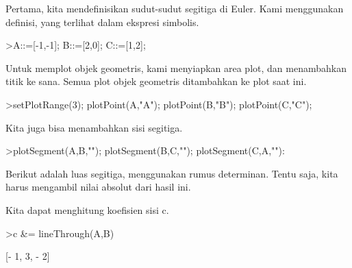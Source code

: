\documentclass[a4paper,10pt]{article}
\begin{document}
\begin{eulernotebook}
\begin{eulercomment}
\begin{eulercomment}
\begin{eulercomment}
\begin{eulercomment}
\begin{eulercomment}
\begin{eulercomment}
\begin{eulercomment}
\begin{eulercomment}
\begin{eulercomment}
\begin{eulercomment}
\begin{eulercomment}
\begin{eulercomment}
\begin{eulercomment}
\begin{eulercomment}
\begin{eulercomment}
\begin{eulercomment}
\begin{eulercomment}
Pertama, kita mendefinisikan sudut-sudut segitiga di Euler. Kami
menggunakan definisi, yang terlihat dalam ekspresi simbolis.
\end{eulercomment}
\begin{eulerprompt}
>A::=[-1,-1]; B::=[2,0]; C::=[1,2];
\end{eulerprompt}
\begin{eulercomment}
Untuk memplot objek geometris, kami menyiapkan area plot, dan
menambahkan titik ke sana. Semua plot objek geometris ditambahkan ke
plot saat ini.
\end{eulercomment}
\begin{eulerprompt}
>setPlotRange(3); plotPoint(A,"A"); plotPoint(B,"B"); plotPoint(C,"C");
\end{eulerprompt}
\begin{eulercomment}
Kita juga bisa menambahkan sisi segitiga.
\end{eulercomment}
\begin{eulerprompt}
>plotSegment(A,B,""); plotSegment(B,C,""); plotSegment(C,A,""):
\end{eulerprompt}
\begin{eulercomment}
Berikut adalah luas segitiga, menggunakan rumus determinan. Tentu
saja, kita harus mengambil nilai absolut dari hasil ini.
\end{eulercomment}
\begin{eulercomment}
Kita dapat menghitung koefisien sisi c.
\end{eulercomment}
\begin{eulerprompt}
>c &= lineThrough(A,B)
\end{eulerprompt}
\begin{euleroutput}
  
                              [- 1, 3, - 2]
  

\end{euleroutput}
\end{eulercomment}
\end{eulercomment}
\end{eulercomment}
\end{eulercomment}
\end{eulercomment}
\end{eulercomment}
\end{eulercomment}
\end{eulercomment}
\end{eulercomment}
\end{eulercomment}
\end{eulercomment}
\end{eulercomment}
\end{eulercomment}
\end{eulercomment}
\end{eulercomment}
\end{eulercomment}
\end{eulernotebook}
\end{document}
